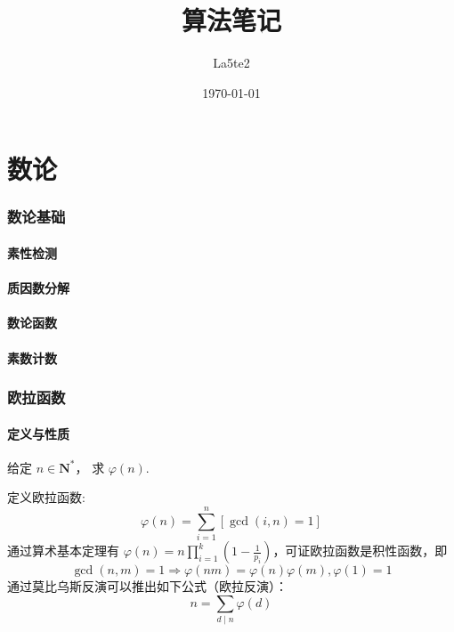 \documentclass[12pt,a4paper]{article}
\title{算法笔记}
\author{La5te2}
\date{\today}
\begin{document}
	
\maketitle
\tableofcontents
\makeatletter
{} %
\makeatother
\graphicspath{{image/}}

\newpage
\part{数论}
\section{数论基础}
\subsection{素性检测}
\subsection{质因数分解}
\subsection{数论函数}
\subsection{素数计数} %
\newpage
\section{欧拉函数}
\subsection{定义与性质}
\begin{mdframed}[leftline=true, linewidth=2pt, linecolor=gray]
	给定 $n\in \mathbf{N^*}$， 求 $\varphi(n)$.
\end{mdframed}
定义欧拉函数: \begin{equation*}\displaystyle\varphi(n)=\sum_{i=1}^{n}[\gcd(i,n)=1]\end{equation*}
通过算术基本定理有 $\displaystyle \varphi(n)=n\prod^{k}_{i=1}(1-\frac{1}{p_i})$，可证欧拉函数是积性函数，即
\begin{equation*}
	\gcd(n,m)=1\Rightarrow \varphi(nm)=\varphi(n)\varphi(m),\varphi(1)=1
\end{equation*}
通过莫比乌斯反演可以推出如下公式（欧拉反演）：
\begin{equation*}
	n=\sum_{d\mid n}\varphi(d)
\end{equation*}
\end{document}
